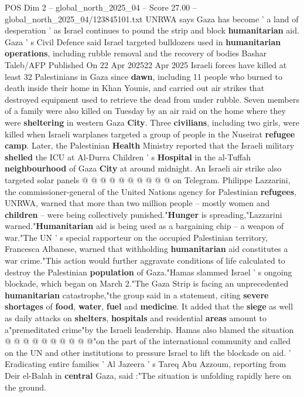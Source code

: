 \begin{textsample}{POS Dim 2 – global\_north\_2025\_04 – Score 27.00 – global\_north\_2025\_04/123845101.txt}  \label{ex:f2_pos_327}
UNRWA says Gaza has become ' a land of desperation ' as Israel continues to pound the strip and block \textbf{humanitarian} aid.
Gaza ' s Civil Defence said Israel targeted bulldozers used in \textbf{humanitarian} \textbf{operations}, including rubble removal and the recovery of bodies Bashar Taleb/AFP Published On 22 Apr 202522 Apr 2025 Israeli forces have killed at least 32 Palestinians in Gaza since \textbf{dawn}, including 11 people who burned to death inside their home in Khan Younis, and carried out air strikes that destroyed equipment used to retrieve the dead from under rubble.
Seven members of a family were also killed on Tuesday by an air raid on the home where they were \textbf{sheltering} in western Gaza \textbf{City}.
Three \textbf{civilians}, including two girls, were killed when Israeli warplanes targeted a group of people in the Nuseirat \textbf{refugee} \textbf{camp}.
Later, the Palestinian \textbf{Health} Ministry reported that the Israeli military \textbf{shelled} the ICU at Al-Durra Children ' s \textbf{Hospital} in the al-Tuffah \textbf{neighbourhood} of Gaza \textbf{City} at around midnight.
An Israeli air strike also targeted solar panels @ @ @ @ @ @ @ @ @ @ on Telegram.
Philippe Lazzarini, the commissioner-general of the United Nations agency for Palestinian \textbf{refugees}, UNRWA, warned that more than two million people -- mostly women and \textbf{children} -- were being collectively punished."\textbf{Hunger} is spreading,"Lazzarini warned."\textbf{Humanitarian} aid is being used as a bargaining chip -- a weapon of war."The UN ' s special rapporteur on the occupied Palestinian territory, Francesca Albanese, warned that withholding \textbf{humanitarian} aid constitutes a war crime."This action would further aggravate conditions of life calculated to destroy the Palestinian \textbf{population} of Gaza."Hamas slammed Israel ' s ongoing blockade, which began on March 2."The Gaza Strip is facing an unprecedented \textbf{humanitarian} catastrophe,"the group said in a statement, citing \textbf{severe} \textbf{shortages} of \textbf{food}, \textbf{water}, \textbf{fuel} and \textbf{medicine}.
It added that the \textbf{siege} as well as daily attacks on \textbf{shelters}, \textbf{hospitals} and residential \textbf{areas} amount to a"premeditated crime"by the Israeli leadership.
Hamas also blamed the situation @ @ @ @ @ @ @ @ @ @"on the part of the international community and called on the UN and other institutions to pressure Israel to lift the blockade on aid. ' Eradicating entire families ' Al Jazeera ' s Tareq Abu Azzoum, reporting from Deir el-Balah in \textbf{central} Gaza, said :"The situation is unfolding rapidly here on the ground.

\end{textsample}
